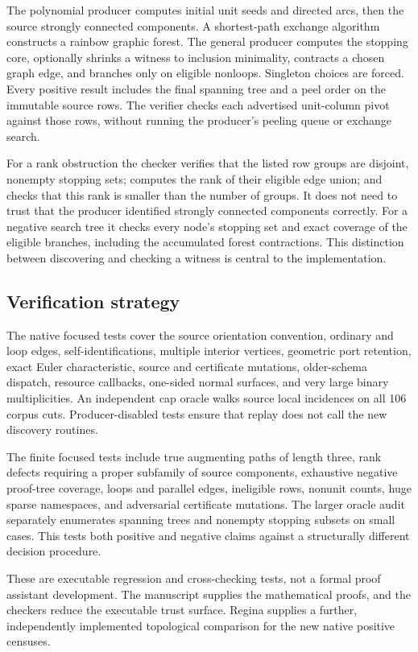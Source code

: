 The polynomial producer computes initial unit seeds and directed arcs,
then the source strongly connected components.  A shortest-path exchange
algorithm constructs a rainbow graphic forest.  The general producer
computes the stopping core, optionally shrinks a witness to inclusion
minimality, contracts a chosen graph edge, and branches only on eligible
nonloops.  Singleton choices are forced.  Every positive result includes
the final spanning tree and a peel order on the immutable source rows.
The verifier checks each advertised unit-column pivot against those rows,
without running the producer's peeling queue or exchange search.

For a rank obstruction the checker verifies that the listed row groups
are disjoint, nonempty stopping sets; computes the rank of their eligible
edge union; and checks that this rank is smaller than the number of groups.
It does not need to trust that the producer identified strongly connected
components correctly.  For a negative search tree it checks every node's
stopping set and exact coverage of the eligible branches, including the
accumulated forest contractions.  This distinction between discovering
and checking a witness is central to the implementation.

\subsection{Verification strategy}
The native focused tests cover the source orientation convention, ordinary
and loop edges, self-identifications, multiple interior vertices, geometric
port retention, exact Euler characteristic, source and certificate
mutations, older-schema dispatch, resource callbacks, one-sided normal
surfaces, and very large binary multiplicities.  An independent cap oracle
walks source local incidences on all 106 corpus cuts.  Producer-disabled
tests ensure that replay does not call the new discovery routines.

The finite focused tests include true augmenting paths of length three,
rank defects requiring a proper subfamily of source components, exhaustive
negative proof-tree coverage, loops and parallel edges, ineligible rows,
nonunit counts, huge sparse namespaces, and adversarial certificate
mutations.  The larger oracle audit separately enumerates spanning trees
and nonempty stopping subsets on small cases.  This tests both positive
and negative claims against a structurally different decision procedure.

These are executable regression and cross-checking tests, not a formal
proof assistant development.  The manuscript supplies the mathematical
proofs, and the checkers reduce the executable trust surface.  Regina
\cite{Regina} supplies a further, independently implemented topological
comparison for the new native positive censuses.

